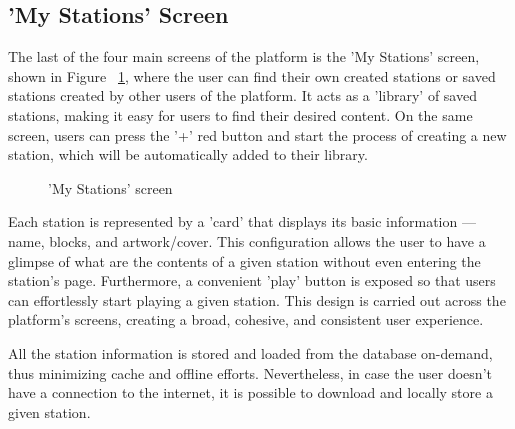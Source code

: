 \subsection{'My Stations' Screen}

The last of the four main screens of the platform is the 'My Stations' screen, shown in Figure ~\ref{fig:mys}, where the user can find their own created stations or saved stations created by other users of the platform. It acts as a 'library' of saved stations, making it easy for users to find their desired content. On the same screen, users can press the '+' red button and start the process of creating a new station, which will be automatically added to their library.

\begin{figure}[h]
\centering
{}
\caption{'My Stations' screen}
\label{fig:mys}
\end{figure}

Each station is represented by a 'card' that displays its basic information — name, blocks, and artwork/cover. This configuration allows the user to have a glimpse of what are the contents of a given station without even entering the station's page. Furthermore, a convenient 'play' button is exposed so that users can effortlessly start playing a given station. This design is carried out across the platform's screens, creating a broad, cohesive, and consistent user experience.

All the station information is stored and loaded from the database on-demand, thus minimizing cache and offline efforts. Nevertheless, in case the user doesn't have a connection to the internet, it is possible to download and locally store a given station.


